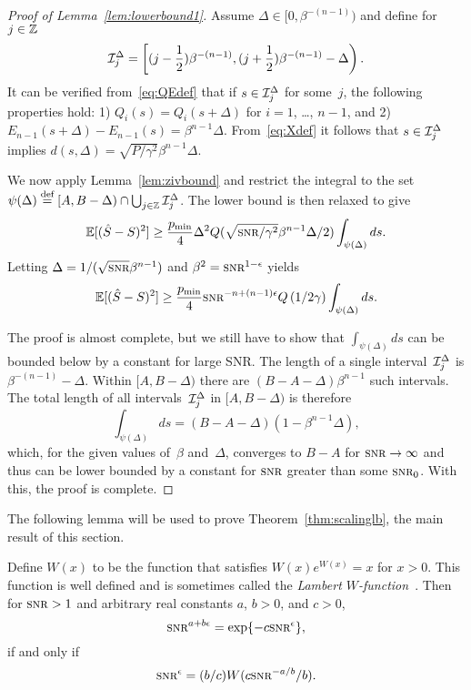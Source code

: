 \begin{proof}[Proof of Lemma~\ref{lem:lowerbound1}]
  Assume $\Delta \in [0, \beta^{-(n-1)})$ and define for $j \in \mathbb{Z}$
  \[ \mathcal{I}_j^\Delta = \left[ (j - \frac12 )\beta^{-(n-1)}, 
    (j + \frac12 ) \beta^{-(n-1)} - \Delta \right).\]
  It can be verified from~\eqref{eq:QEdef} that if $s \in \mathcal{I}_j^\Delta$ for
  some~$j$, the following properties hold: 1) $Q_i(s) = Q_i(s+\Delta)$ for
  $i=1$, \dots, $n-1$, and 2) $E_{n-1}(s+\Delta) - E_{n-1}(s) =
  \beta^{n-1}\Delta$.  From~\eqref{eq:Xdef} it follows that
  $s \in \mathcal{I}_j^\Delta$ implies $d(s, \Delta) = \sqrt{P/\gamma^2} \beta^{n-1}\Delta$.

  We now apply Lemma~\ref{lem:zivbound} and restrict the integral to the
  set~$\psi(\Delta) \stackrel{\text{def}}{=} [A,B-\Delta) \cap \bigcup_{j\in\mathbb{Z}} \mathcal{I}_j^\Delta$. The
  lower bound is then relaxed to give
  \begin{equation*}
    \mse \ge \frac{\pmin}{4} \Delta^2 Q(\sqrt{\snr/\gamma^2} \beta^{n-1}
    \Delta/2) \int_{\psi(\Delta)} ds.
  \end{equation*}
  Letting $\Delta = 1/(\sqrt{\snr}\beta^{n-1})$ and $\beta^2 = \snr^{1-\e}$
  yields
  \begin{equation*}
    \mse \ge \frac{\pmin}{4} \snr^{-n+(n-1)\e} Q\left(1/2\gamma\right)
    \int_{\psi(\Delta)} ds.
  \end{equation*}

  The proof is almost complete, but we still have to show that
  $\int_{\psi(\Delta)}ds$ can be bounded below by a constant for large SNR. The
  length of a single interval~$\mathcal{I}_j^\Delta$ is $\beta^{-(n-1)} - \Delta$. Within
  $[A,B-\Delta)$ there are $(B-A-\Delta)\beta^{n-1}$ such
  intervals. The total length of all intervals~$\mathcal{I}_j^\Delta$ in $[A, B-\Delta)$
  is therefore
  \[ \int_{\psi(\Delta)} ds = (B-A-\Delta)
  (1 - \beta^{n-1}\Delta), \]
  which, for the given values of~$\beta$ and~$\Delta$, 
  converges to $B-A$ for $\snr \ra \infty$ and thus can be lower bounded by a
  constant for $\snr$ greater than some $\snr_0$. With this, the proof is
  complete.
\end{proof}

The following lemma will be used to prove Theorem~\ref{thm:scalinglb}, the main
result of this section.

\begin{lemma}
  \label{lem:epssolution}
  Define $W(x)$ to be the function that satisfies $W(x)e^{W(x)} = x$ for $x >
  0$.  This function is well defined and is sometimes called the \emph{Lambert
  $W$-function}~\textnormal{\cite{CorlessGHJK1996}}. Then for $\snr > 1$ and
  arbitrary real constants $a$, $b>0$, and $c > 0$, 
  \begin{equation}
    \label{eq:epsequation}
    \snr^{a+b\e} = \exp\{-c\snr^\e\},
  \end{equation}
  if and only if
  \begin{equation}
    \label{eq:epssolution}
    \snr^\e = (b/c) W(c\snr^{-a/b} / b).
  \end{equation}
\end{lemma}

